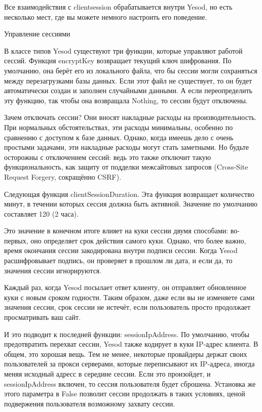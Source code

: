 Все взаимодействия с clientsession обрабатывается внутри Yesod, но есть несколько мест, где вы можете немного настроить его поведение.

Управление сессиями

В классе типов Yesod существуют три функции, которые управляют работой сессий. Функция encryptKey возвращает текущий ключ шифрования. По умолчанию, она берёт его из локального файла, что бы сессии могли сохраняться между перезагрузками базы данных. Если этот файл не существует, то он будет автоматически создан и заполнен случайными данными. А если переопределить эту функцию, так чтобы она возвращала Nothing, то сессии будут отключены.

Зачем отключать сессии? Они вносят накладные расходы на производительность. При нормальных обстоятельствах, эти расходы минимальны, особенно по сравнению с доступом к базе данных. Однако, когда имеешь дело с очень простыми задачами, эти накладные расходы могут стать заметными. Но будьте осторожны с отключением сессий: ведь это также отключит такую функциональность, как защиту от подделки межсайтовых запросов (Cross-Site Request Forgery, сокращённо CSRF).

Следующая функция clientSessionDuration. Эта функция возвращает количество минут, в течении которых сессия должна быть активной. Значение по умолчанию составляет 120 (2 часа).

Это значение в конечном итоге влияет на куки сессии двумя способами: во-первых, оно определяет срок действия самого куки. Однако, что более важно, время окончания сессии закодирована внутри подписи сессии. Когда Yesod расшифровывает подпись, он проверяет в прошлом ли дата, и если да, то значения сессии игнорируются.

Каждый раз, когда Yesod посылает ответ клиенту, он отправляет обновленное куки с новым сроком годности. Таким образом, даже если вы не изменяете сами значения сессии, срок сессии не истечёт, если пользователь просто продолжает просматривать ваш сайт.

И это подводит к последней функции: sessionIpAddress. По умолчанию, чтобы предотвратить перехват сессии, Yesod также кодирует в куки IP-адрес клиента. В общем, это хорошая вещь. Тем не менее, некоторые провайдеры держат своих пользователей за прокси серверами, которые переписывают их IP-адреса, иногда меняя исходный адресс в середине сессии. Если это произойдет, и sessionIpAddress включен, то сессия пользователя будет сброшена. Установка же этого параметра в False позволит сессии продолжать в таких условиях, ценой подвержения пользователя возможному захвату сессии.

